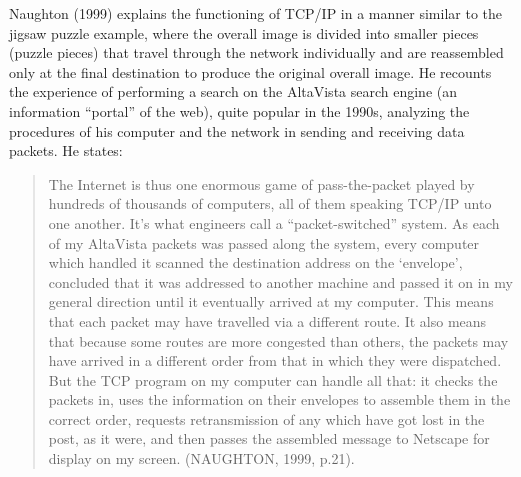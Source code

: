 Naughton (1999) explains the functioning of TCP/IP in a manner similar to the jigsaw puzzle example, where the overall image is divided into smaller pieces (puzzle pieces) that travel through the network individually and are reassembled only at the final destination to produce the original overall image. He recounts the experience of performing a search on the AltaVista search engine (an information ``portal'' of the web), quite popular in the 1990s, analyzing the procedures of his computer and the network in sending and receiving data packets. He states:

\begin{quote}
The Internet is thus one enormous game of pass-the-packet played by hundreds of thousands of computers, all of them speaking TCP/IP unto one another. It's what engineers call a ``packet-switched'' system. As each of my AltaVista packets was passed along the system, every computer which handled it scanned the destination address on the `envelope', concluded that it was addressed to another machine and passed it on in my general direction until it eventually arrived at my computer. This means that each packet may have travelled via a different route. It also means that because some routes are more congested than others, the packets may have arrived in a different order from that in which they were dispatched. But the TCP program on my computer can handle all that: it checks the packets in, uses the information on their envelopes to assemble them in the correct order, requests retransmission of any which have got lost in the post, as it were, and then passes the assembled message to Netscape for display on my screen. (NAUGHTON, 1999, p.21).
\end{quote}

